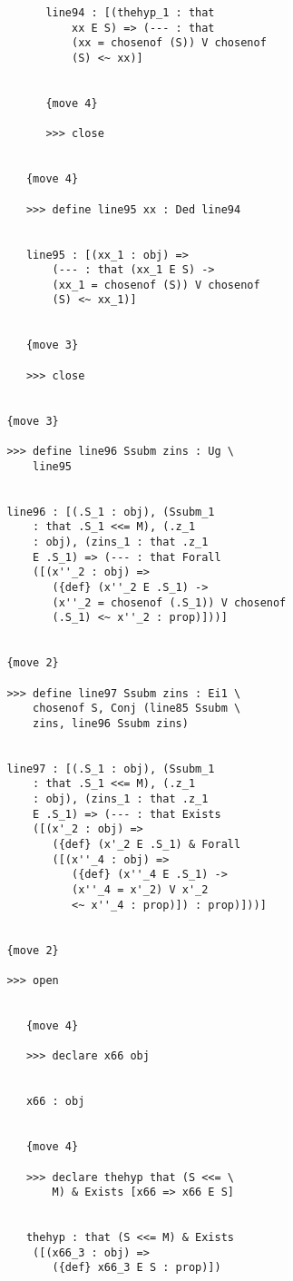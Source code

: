 \documentclass{article}
\begin{document}
\begin{verbatim}
               line94 : [(thehyp_1 : that 
                   xx E S) => (--- : that 
                   (xx = chosenof (S)) V chosenof 
                   (S) <~ xx)]


               {move 4}

               >>> close


            {move 4}

            >>> define line95 xx : Ded line94


            line95 : [(xx_1 : obj) => 
                (--- : that (xx_1 E S) -> 
                (xx_1 = chosenof (S)) V chosenof 
                (S) <~ xx_1)]


            {move 3}

            >>> close


         {move 3}

         >>> define line96 Ssubm zins : Ug \
             line95


         line96 : [(.S_1 : obj), (Ssubm_1 
             : that .S_1 <<= M), (.z_1 
             : obj), (zins_1 : that .z_1 
             E .S_1) => (--- : that Forall 
             ([(x''_2 : obj) => 
                ({def} (x''_2 E .S_1) -> 
                (x''_2 = chosenof (.S_1)) V chosenof 
                (.S_1) <~ x''_2 : prop)]))]


         {move 2}

         >>> define line97 Ssubm zins : Ei1 \
             chosenof S, Conj (line85 Ssubm \
             zins, line96 Ssubm zins)


         line97 : [(.S_1 : obj), (Ssubm_1 
             : that .S_1 <<= M), (.z_1 
             : obj), (zins_1 : that .z_1 
             E .S_1) => (--- : that Exists 
             ([(x'_2 : obj) => 
                ({def} (x'_2 E .S_1) & Forall 
                ([(x''_4 : obj) => 
                   ({def} (x''_4 E .S_1) -> 
                   (x''_4 = x'_2) V x'_2 
                   <~ x''_4 : prop)]) : prop)]))]


         {move 2}

         >>> open


            {move 4}

            >>> declare x66 obj


            x66 : obj


            {move 4}

            >>> declare thehyp that (S <<= \
                M) & Exists [x66 => x66 E S]


            thehyp : that (S <<= M) & Exists 
             ([(x66_3 : obj) => 
                ({def} x66_3 E S : prop)])



\end{verbatim}
\end{document}
